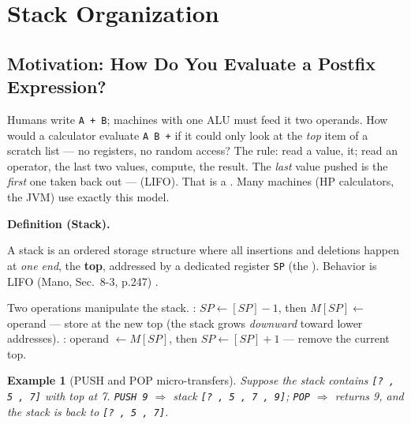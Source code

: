 \documentclass[11pt]{article}
\newtheorem{example}{Example}[section]
\newenvironment{definitionbox}[1]{%
  \par\noindent\textbf{Definition (#1).}\ \itshape
}{\par\vspace{0.3em}}
\begin{document}
\section{Stack Organization}
\label{sec:stack-organization}

\subsection{Motivation: How Do You Evaluate a Postfix Expression?}

Humans write \texttt{A + B}; machines with one ALU must feed it two operands. How would a calculator evaluate \texttt{A B +} if it could only look at the \emph{top} item of a scratch list --- no registers, no random access? The rule: read a value,  it; read an operator,  the last two values, compute,  the result. The \emph{last} value pushed is the \emph{first} one taken back out ---  (LIFO). That is a . Many machines (HP calculators, the JVM) use exactly this model.

\begin{definitionbox}{Stack}
A stack is an ordered storage structure where all insertions and deletions happen at \emph{one end}, the \textbf{top}, addressed by a dedicated register \texttt{SP} (the ). Behavior is LIFO (Mano, Sec.~8-3, p.247) \cite{Mano1993_computer_system_architecture}.
\end{definitionbox}

Two operations manipulate the stack. : $SP \gets [SP] - 1$, then $M[SP] \gets$ operand --- store at the new top (the stack grows \emph{downward} toward lower addresses). : operand $\gets M[SP]$, then $SP \gets [SP] + 1$ --- remove the current top.

\begin{example}[PUSH and POP micro-transfers]
Suppose the stack contains \texttt{[? , 5 , 7]} with top at 7. \texttt{PUSH 9} $\Rightarrow$ stack \texttt{[? , 5 , 7 , 9]}; \texttt{POP} $\Rightarrow$ returns 9, and the stack is back to \texttt{[? , 5 , 7]}.
\end{example}
\end{document}
